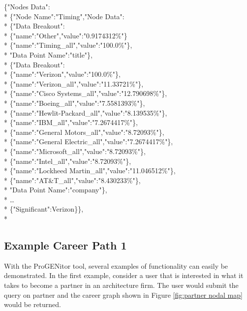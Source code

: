 \pagebreak
\begin{tt}
\begin{footnotesize}
\noindent \{"Nodes Data":\\*
	\indent \{"Node Name":"Timing","Node Data":\\*
		\indent \{"Data Breakout":\\*
		\indent \indent	\{"name":"Other","value":"0.9174312\%"\}\\*
		\indent	\indent \{"name":"Timing\_all","value":"100.0\%"\},\\*
		\indent	"Data Point Name":"title"\},\\*
		\indent\{"Data Breakout":\\*
		\indent	\indent	\{"name":"Verizon","value":"100.0\%"\},\\*
		\indent	\indent	\{"name":"Verizon\_all","value":"11.33721\%"\},\\*
		\indent	\indent	\{"name":"Cisco Systems\_all","value":"12.790698\%"\},\\*
		\indent	\indent	\{"name":"Boeing\_all","value":"7.5581393\%"\},\\*
		\indent	\indent	\{"name":"Hewlit-Packard\_all","value":"8.139535\%"\},\\*
		\indent	\indent	\{"name":"IBM\_all","value":"7.2674417\%"\},\\*
		\indent	\indent	\{"name":"General Motors\_all","value":"8.72093\%"\},\\*
		\indent	\indent	\{"name":"General Electric\_all","value":"7.2674417\%"\},\\*
		\indent	\indent	\{"name":"Microsoft\_all","value":"8.72093\%"\},\\*
		\indent	\indent	\{"name":"Intel\_all","value":"8.72093\%"\},\\*
		\indent	\indent	\{"name":"Lockheed Martin\_all","value":"11.046512\%"\},\\*
		\indent	\indent	\{"name":"AT\&T\_all","value":"8.430233\%"\},\\*
		\indent"Data Point Name":"company"\},\\*
		\indent\ldots\\*
		\indent \{"Significant":Verizon\}\},\\*
\end{footnotesize}
\end{tt}

\subsection{Example Career Path 1}
With the ProGENitor tool, several examples of functionality can easily be
demonstrated.  In the first example, consider a user that is interested in
what it takes to become a partner in an architecture firm.  The user would submit the query on
partner and the career graph shown in Figure \ref{fig:partner nodal map} would
be returned.

